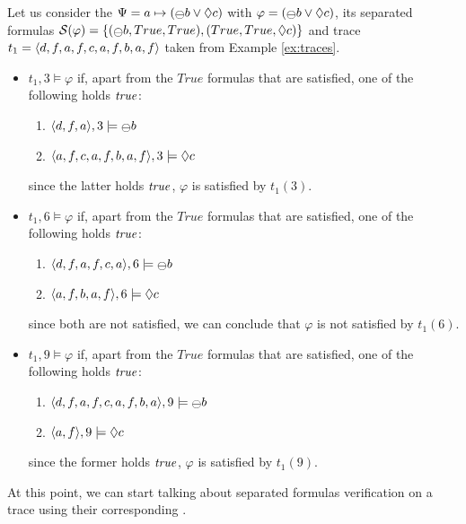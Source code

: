 \begin{example}\label{ex:subeval-formula}
Let us consider the \rcon\xspace $\Psi = a \mapsto (\Yesterday b \lOR \Diamond c)$ with $\varphi = (\Yesterday b \lOR \Diamond c)$, its separated formulas $\S(\varphi) = \{(\Yesterday b , True, True),(True, True, \Diamond c)\}$ and trace $t_1 = \langle d,f,a,f,c,a,f,b,a,f \rangle$ taken from Example \ref{ex:traces}.
\begin{itemize}
\item $t_1,3 \models \varphi$ if, apart from the $True$ formulas that are satisfied, one of the following holds $\mathit{true}$:
\begin{enumerate}
\item $\tup{d,f,a},3 \models \Yesterday b$
\item $\langle a,f,c,a,f,b,a,f \rangle,3 \models \Diamond c$
\end{enumerate}
since the latter holds $\mathit{true}$, $\varphi$ is satisfied by $t_1(3)$.

\item $t_1,6 \models \varphi$ if, apart from the $True$ formulas that are satisfied, one of the following holds $\mathit{true}$:
\begin{enumerate}
\item $\tup{d,f,a,f,c,a},6 \models \Yesterday b$
\item $\langle a,f,b,a,f \rangle,6 \models \Diamond c$
\end{enumerate}
since both are not satisfied, we can conclude that $\varphi$ is not satisfied by $t_1(6)$.

\item $t_1,9 \models \varphi$ if, apart from the $True$ formulas that are satisfied, one of the following holds $\mathit{true}$:
\begin{enumerate}
\item $\tup{d,f,a,f,c,a,f,b,a},9 \models \Yesterday b$
\item $\langle a,f \rangle,9 \models \Diamond c$
\end{enumerate}
since the former holds $\mathit{true}$, $\varphi$ is satisfied by $t_1(9)$.
\end{itemize}
\end{example}
At this point, we can start talking about separated formulas verification on a trace using their corresponding \DFAs. 

